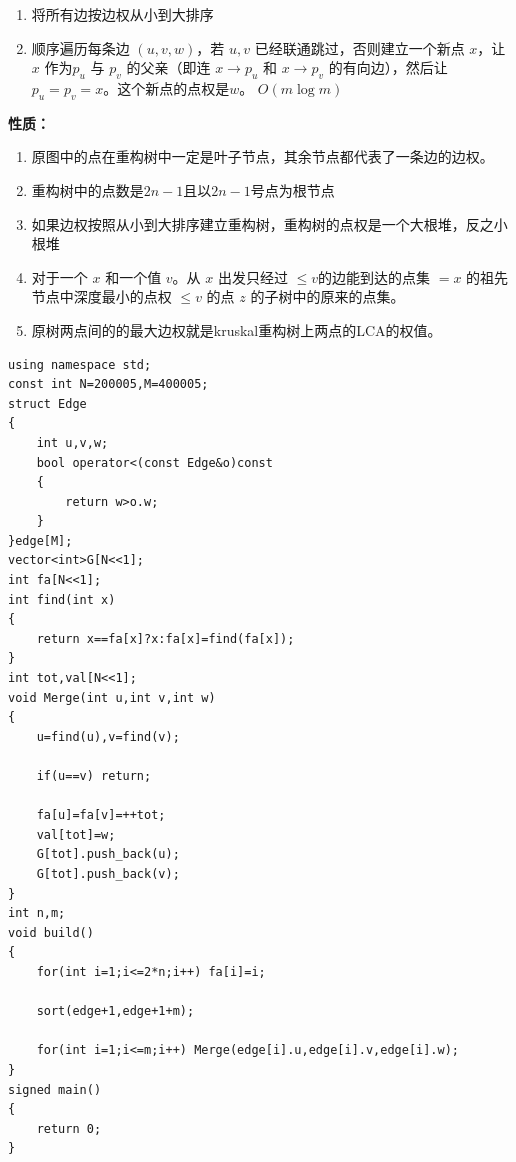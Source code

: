 \begin{enumerate}
\item 将所有边按边权从小到大排序 
\item 顺序遍历每条边 $(u,v,w)$，若 $u,v$ 已经联通跳过，否则建立一个新点 $x$，让$x$ 作为$p_u$ 与 $p_v$ 的父亲（即连 $x\to p_u$ 和 $x\to p_v$ 的有向边），然后让 $p_u=p_v=x$。这个新点的点权是$w$。
   $O(m\log m)$
\end{enumerate}
\textbf{性质：}
\begin{enumerate}
\item 原图中的点在重构树中一定是叶子节点，其余节点都代表了一条边的边权。
\item 重构树中的点数是$2n-1$且以$2n-1$号点为根节点
\item 如果边权按照从小到大排序建立重构树，重构树的点权是一个大根堆，反之小根堆
\item 对于一个 $x$ 和一个值 $v$。从 $x$ 出发只经过 $≤v$的边能到达的点集 $= x$ 的祖先节点中深度最小的点权 $≤v$ 的点 $z$ 的子树中的原来的点集。
\item 原树两点间的的最大边权就是kruskal重构树上两点的LCA的权值。
\end{enumerate}
\begin{verbatim}
using namespace std;
const int N=200005,M=400005;
struct Edge
{
    int u,v,w;
    bool operator<(const Edge&o)const
    {
        return w>o.w;
    }
}edge[M];
vector<int>G[N<<1];
int fa[N<<1];
int find(int x)
{
    return x==fa[x]?x:fa[x]=find(fa[x]);
}
int tot,val[N<<1];
void Merge(int u,int v,int w)
{
    u=find(u),v=find(v);

    if(u==v) return;

    fa[u]=fa[v]=++tot;
    val[tot]=w;
    G[tot].push_back(u);
    G[tot].push_back(v);
}
int n,m;
void build()
{
    for(int i=1;i<=2*n;i++) fa[i]=i;

    sort(edge+1,edge+1+m);

    for(int i=1;i<=m;i++) Merge(edge[i].u,edge[i].v,edge[i].w);
}
signed main()
{
    return 0;
}
\end{verbatim}